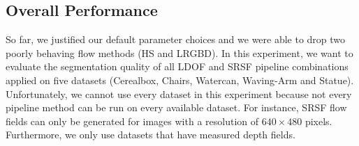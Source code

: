 \subsection{Overall Performance}
\label{sec:overall_performance}
So far, we justified our default parameter choices and we were able to drop two poorly behaving flow methods (HS and LRGBD). In this experiment, we want to evaluate the segmentation quality of all LDOF and SRSF pipeline combinations applied on five datasets (Cerealbox, Chairs, Watercan, Waving-Arm and Statue). Unfortunately, we cannot use every dataset in this experiment because not every pipeline method can be run on every available dataset. For instance, SRSF flow fields can only be generated for images with a resolution of $640 \times 480$ pixels. Furthermore, we only use datasets that have measured depth fields.\\ \\
